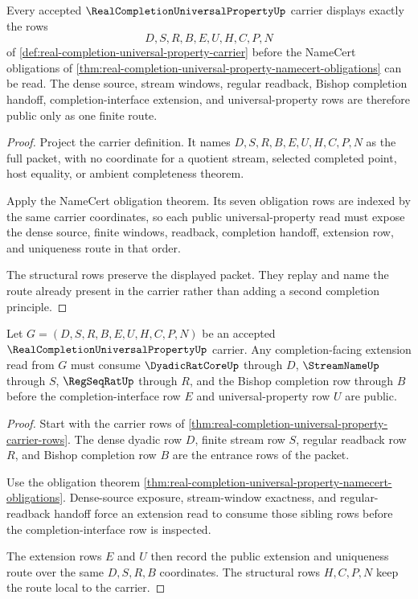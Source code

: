 \begin{theorem}
\label{thm:real-completion-universal-property-carrier-rows}
Every accepted $\RealCompletionUniversalPropertyUp$ carrier displays exactly the rows
$$
D,S,R,B,E,U,H,C,P,N
$$
of \autoref{def:real-completion-universal-property-carrier} before the NameCert obligations of \autoref{thm:real-completion-universal-property-namecert-obligations} can be read. The dense source, stream windows, regular readback, Bishop completion handoff, completion-interface extension, and universal-property rows are therefore public only as one finite route.
\end{theorem}
\begin{proof}
Project the carrier definition. It names $D,S,R,B,E,U,H,C,P,N$ as the full packet, with no coordinate for a quotient stream, selected completed point, host equality, or ambient completeness theorem.

Apply the NameCert obligation theorem. Its seven obligation rows are indexed by the same carrier coordinates, so each public universal-property read must expose the dense source, finite windows, readback, completion handoff, extension row, and uniqueness route in that order.

The structural rows preserve the displayed packet. They replay and name the route already present in the carrier rather than adding a second completion principle.
\end{proof}

\begin{theorem}
\label{thm:real-completion-universal-property-extension-route}
Let $G=(D,S,R,B,E,U,H,C,P,N)$ be an accepted $\RealCompletionUniversalPropertyUp$ carrier. Any completion-facing extension read from $G$ must consume $\DyadicRatCoreUp$ through $D$, $\StreamNameUp$ through $S$, $\RegSeqRatUp$ through $R$, and the Bishop completion row through $B$ before the completion-interface row $E$ and universal-property row $U$ are public.
\end{theorem}
\begin{proof}
Start with the carrier rows of \autoref{thm:real-completion-universal-property-carrier-rows}. The dense dyadic row $D$, finite stream row $S$, regular readback row $R$, and Bishop completion row $B$ are the entrance rows of the packet.

Use the obligation theorem \autoref{thm:real-completion-universal-property-namecert-obligations}. Dense-source exposure, stream-window exactness, and regular-readback handoff force an extension read to consume those sibling rows before the completion-interface row is inspected.

The extension rows $E$ and $U$ then record the public extension and uniqueness route over the same $D,S,R,B$ coordinates. The structural rows $H,C,P,N$ keep the route local to the carrier.
\end{proof}

